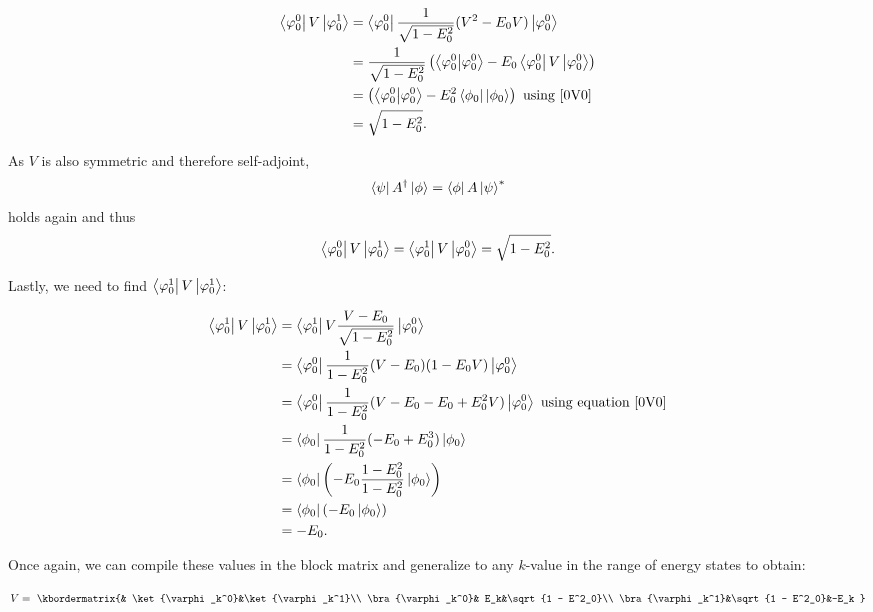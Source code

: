 \begin{align} \begin{split}
\left\langle{\varphi_0^0}\right\vert V\left\vert{\varphi_0^1}\right\rangle&= \left\langle{\varphi_0^0}\right\vert  \frac{1}{\sqrt{1 - E^2_0}} (V^2 - E_0V) \left\vert{\varphi_0^0}\right\rangle\\
&= \frac{1}{\sqrt{1 - E^2_0}} \left( \braket{\varphi_0^0}{\varphi_0^0} - E_0 \left\langle{\varphi_0^0}\right\vert V \left\vert{\varphi_0^0}\right\rangle\right)\\
&=  \left( \braket{\varphi_0^0}{\varphi_0^0} - E_0^2 \left\langle{\phi_0}\right\vert \left\vert{\phi_0}\right\rangle\right) \text{ using \ref{0V0}}\\
&= \sqrt{1 - E^2_0}.
\end{split} \end{align}

As $V$ is also symmetric and therefore self-adjoint, $$\left\langle{\psi}\right\vert A^{\dagger}\left\vert{\phi}\right\rangle= \left\langle{\phi}\right\vert A \left\vert{\psi}\right\rangle^{*}$$ holds again and thus $$\left\langle{\varphi_0^0}\right\vert V\left\vert{\varphi_0^1}\right\rangle = \left\langle{\varphi_0^1}\right\vert V\left\vert{\varphi_0^0}\right\rangle = \sqrt{1 - E^2_0}.$$

Lastly, we need to find $\left\langle{\varphi_0^1}\right\vert V\left\vert{\varphi_0^1}\right\rangle$:

\begin{align} \begin{split}
\left\langle{\varphi_0^1}\right\vert V\left\vert{\varphi_0^1}\right\rangle &= \left\langle{\varphi_0^1}\right\vert  V\frac{V- E_0}{\sqrt{1 - E^2_0}} \left\vert{\varphi_0^0}\right\rangle\\
&= \left\langle{\varphi_0^0}\right\vert \frac{1}{1 - E^2_0} (V - E_0)(1 - E_0V)\left\vert{\varphi_0^0}\right\rangle\\
&= \left\langle{\varphi_0^0}\right\vert \frac{1}{1 - E^2_0} (V - E_0 - E_0 + E_0^2V)\left\vert{\varphi_0^0}\right\rangle \text{ using equation \ref{0V0}}\\
&= \left\langle{\phi_0}\right\vert \frac{1}{1 - E^2_0} (-E_0 + E_0^3)\left\vert{\phi_0}\right\rangle\\
&= \left\langle{\phi_0}\right\vert \left(- E_0 \frac{1 - E^2_0}{1 - E^2_0}\left\vert{\phi_0}\right\rangle\right)\\
&= \left\langle{\phi_0}\right\vert \left(- E_0 \left\vert{\phi_0}\right\rangle\right)\\
&= - E_0.
\end{split} \end{align}

Once again, we can compile these values in the block matrix and generalize to any $k$-value in the range of energy states to obtain:

\begin{equation}
V = \
\kbordermatrix{& \ket{\varphi_k^0}&\ket{\varphi_k^1}\\
\bra{\varphi_k^0}& E_k&\sqrt{1 - E^2_0}\\
\bra{\varphi_k^1}&\sqrt{1 - E^2_0}&-E_k
}
\end{equation}
\newpage

